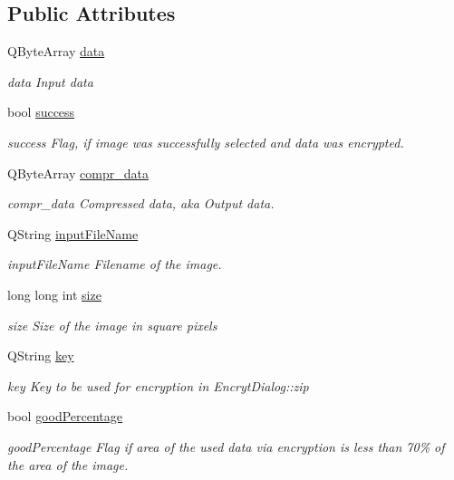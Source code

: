 \subsection*{Public Attributes}
\begin{DoxyCompactItemize}
\item 
Q\+Byte\+Array \hyperlink{class_encrypt_dialog_acf3a8bbce90d99ef17fec093c35b1008}{data}
\begin{DoxyCompactList}\small\item\em data Input data \end{DoxyCompactList}\item 
bool \hyperlink{class_encrypt_dialog_ada4900bcd40894d9c098c65aa4066ac9}{success}
\begin{DoxyCompactList}\small\item\em success Flag, if image was successfully selected and data was encrypted. \end{DoxyCompactList}\item 
Q\+Byte\+Array \hyperlink{class_encrypt_dialog_a3e8998aa39696cbd1242f6420ef18143}{compr\+\_\+data}
\begin{DoxyCompactList}\small\item\em compr\+\_\+data Compressed data, aka Output data. \end{DoxyCompactList}\item 
Q\+String \hyperlink{class_encrypt_dialog_a859b1bc2f032a247632b879bf8663d0b}{input\+File\+Name}
\begin{DoxyCompactList}\small\item\em input\+File\+Name Filename of the image. \end{DoxyCompactList}\item 
long long int \hyperlink{class_encrypt_dialog_a7fff26f838ab50f807744cd2c4bed033}{size}
\begin{DoxyCompactList}\small\item\em size Size of the image in square pixels \end{DoxyCompactList}\item 
Q\+String \hyperlink{class_encrypt_dialog_a1afdef3c665fb0d0fae06d1df8e84951}{key}
\begin{DoxyCompactList}\small\item\em key Key to be used for encryption in Encryt\+Dialog\+::zip \end{DoxyCompactList}\item 
bool \hyperlink{class_encrypt_dialog_a0c821b893cfddd7a6c07bbd270ba49e9}{good\+Percentage}
\begin{DoxyCompactList}\small\item\em good\+Percentage Flag if area of the used data via encryption is less than 70\% of the area of the image. \end{DoxyCompactList}\item 

\end{DoxyCompactItemize}
